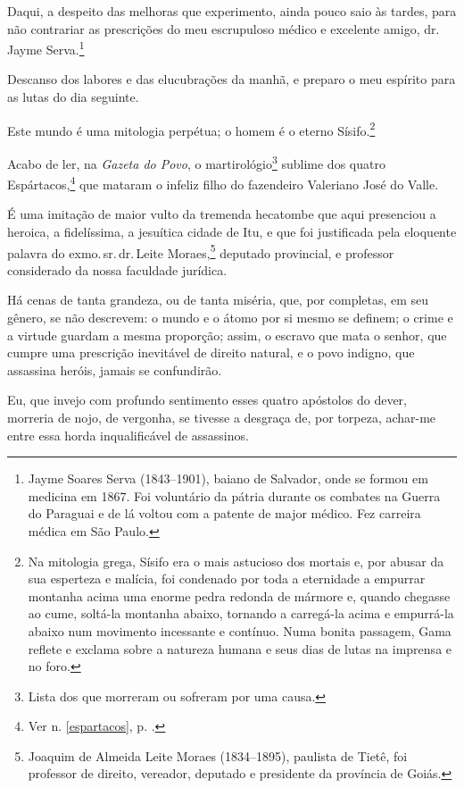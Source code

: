 {
Daqui, a despeito das melhoras que experimento, ainda pouco saio às
tardes, para não contrariar as prescrições do meu escrupuloso médico e
excelente amigo, dr.\,Jayme Serva.\footnote{Jayme Soares Serva
  (1843--1901), baiano de Salvador, onde se formou em medicina em 1867.
  Foi voluntário da pátria durante os combates na Guerra do Paraguai e
  de lá voltou com a patente de major médico. Fez carreira médica em São
  Paulo.}

Descanso dos labores e das elucubrações da manhã, e preparo o meu
espírito para as lutas do dia seguinte.

Este mundo é uma mitologia perpétua; o homem é o eterno Sísifo.\footnote{
  Na mitologia grega, Sísifo era o mais astucioso dos mortais e, por
  abusar da sua esperteza e malícia, foi condenado por toda a eternidade
  a empurrar montanha acima uma enorme pedra redonda de mármore e,
  quando chegasse ao cume, soltá-la montanha abaixo,
  tornando a carregá-la acima e empurrá-la abaixo num movimento
  incessante e contínuo. Numa bonita passagem, Gama reflete e exclama
  sobre a natureza humana e seus dias de lutas na imprensa e no foro.}

Acabo de ler, na \emph{Gazeta do Povo}, o martirológio\footnote{Lista
  dos que morreram ou sofreram por uma causa.} sublime dos quatro
Espártacos,\footnote{Ver n. \ref{espartacos}, p. \pageref{espartacos}.} que mataram o infeliz filho do fazendeiro Valeriano José do Valle.

É uma imitação de maior vulto da tremenda hecatombe que aqui presenciou
a heroica, a fidelíssima, a jesuítica cidade de Itu, e que foi
justificada pela eloquente palavra do exmo.\,sr.\,dr.\,Leite
Moraes,\footnote{Joaquim de Almeida Leite Moraes (1834--1895), paulista
  de Tietê, foi professor de direito, vereador, deputado e presidente da
  província de Goiás.} deputado provincial, e professor considerado da
nossa faculdade jurídica.

Há cenas de tanta grandeza, ou de tanta miséria, que, por completas, em
seu gênero, se não descrevem: o mundo e o átomo por si mesmo se definem;
o crime e a virtude guardam a mesma proporção; assim, o escravo que mata
o senhor, que cumpre uma prescrição inevitável de direito natural, e o
povo indigno, que assassina heróis, jamais se confundirão.

Eu, que invejo com profundo sentimento esses quatro apóstolos do dever,
morreria de nojo, de vergonha, se tivesse a desgraça de, por torpeza,
achar-me entre essa horda inqualificável de assassinos.

}
